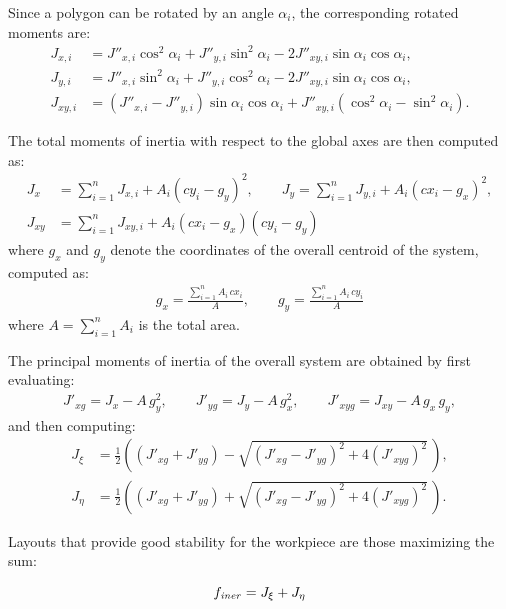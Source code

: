 \noindent Since a polygon can be rotated by an angle $\alpha_i$, the corresponding rotated moments are:
\begin{align*}
	J_{x,i} &= J''_{x,i}\cos^2\alpha_i + J''_{y,i}\sin^2\alpha_i - 2J''_{xy,i}\sin\alpha_i\cos\alpha_i,\\
	J_{y,i} &= J''_{x,i}\sin^2\alpha_i + J''_{y,i}\cos^2\alpha_i - 2J''_{xy,i}\sin\alpha_i\cos\alpha_i,\\
	J_{xy,i} &= (J''_{x,i} - J''_{y,i})\sin\alpha_i\cos\alpha_i + J''_{xy,i}(\cos^2\alpha_i - \sin^2\alpha_i).
\end{align*}

\noindent The total moments of inertia with respect to the global axes are then computed as:
\begin{align*}
	J_x &= \sum_{i=1}^{n} J_{x,i} + A_i(cy_{i} - g_y)^2, \qquad
	J_y = \sum_{i=1}^{n} J_{y,i} + A_i(cx_{i} - g_x)^2,\\
	J_{xy} &= \sum_{i=1}^{n} J_{xy,i} + A_i(cx_{i} - g_x)(cy_{i} - g_y)
\end{align*}
where $g_x$ and $g_y$ denote the coordinates of the overall centroid of the system, computed as:
\begin{align*}
	g_x = \frac{\sum_{i=1}^{n} A_i\, cx_{i}}{A}, \qquad
	g_y = \frac{\sum_{i=1}^{n} A_i\, cy_{i}}{A}
\end{align*}
where $A = \sum_{i=1}^{n} A_i$ is the total area.

\noindent The principal moments of inertia of the overall system are obtained by first evaluating:
\begin{align*}
	J'_{xg} = J_x - A\, g_y^2, \qquad
	J'_{yg} = J_y - A\, g_x^2, \qquad
	J'_{xyg} = J_{xy} - A\, g_x\, g_y,
\end{align*}
and then computing:
\begin{align*}
	J_\xi &= \tfrac{1}{2}
	\left(
	(J'_{xg} + J'_{yg})
	- \sqrt{(J'_{xg} - J'_{yg})^2 + 4(J'_{xyg})^2}\,
	\right), \\%
	J_\eta &= \tfrac{1}{2}
	\left(
	(J'_{xg} + J'_{yg})
	+ \sqrt{(J'_{xg} - J'_{yg})^2 + 4(J'_{xyg})^2}\,
	\right).
\end{align*}

\noindent Layouts that provide good stability for the workpiece are those maximizing the sum:

\begin{equation}
	f_\mathit{iner} = J_\xi + J_\eta
	\label{eq:finer}
\end{equation}

